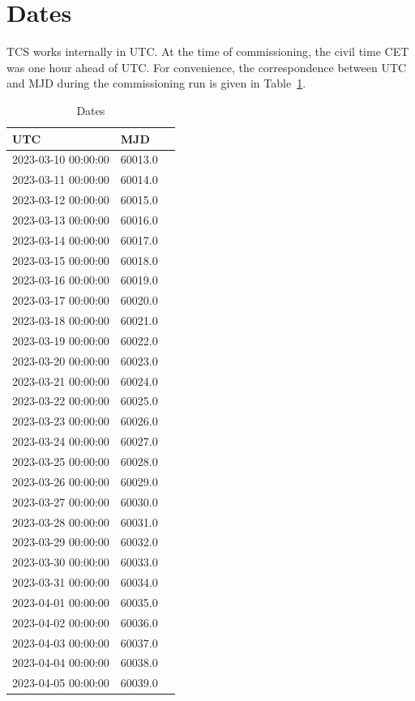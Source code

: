 \documentclass{article}
\begin{document}
\clearpage
\section{Dates}

TCS works internally in UTC. At the time of commissioning, the civil time CET was one hour ahead of UTC. For convenience, the correspondence between UTC and MJD during the commissioning run is given in Table~\ref{table:dates}.

\begin{table}[pb]
\caption{Dates}
\label{table:dates}
\begin{center}
\begin{tabular}{lll}
\hline
UTC&MJD\\
\hline
2023-03-10 00:00:00&60013.0\\
2023-03-11 00:00:00&60014.0\\
2023-03-12 00:00:00&60015.0\\
2023-03-13 00:00:00&60016.0\\
2023-03-14 00:00:00&60017.0\\
2023-03-15 00:00:00&60018.0\\
2023-03-16 00:00:00&60019.0\\
2023-03-17 00:00:00&60020.0\\
2023-03-18 00:00:00&60021.0\\
2023-03-19 00:00:00&60022.0\\
2023-03-20 00:00:00&60023.0\\
2023-03-21 00:00:00&60024.0\\
2023-03-22 00:00:00&60025.0\\
2023-03-23 00:00:00&60026.0\\
2023-03-24 00:00:00&60027.0\\
2023-03-25 00:00:00&60028.0\\
2023-03-26 00:00:00&60029.0\\
2023-03-27 00:00:00&60030.0\\
2023-03-28 00:00:00&60031.0\\
2023-03-29 00:00:00&60032.0\\
2023-03-30 00:00:00&60033.0\\
2023-03-31 00:00:00&60034.0\\
2023-04-01 00:00:00&60035.0\\
2023-04-02 00:00:00&60036.0\\
2023-04-03 00:00:00&60037.0\\
2023-04-04 00:00:00&60038.0\\
2023-04-05 00:00:00&60039.0\\

\end{tabular}
\end{center}
\end{table}
\end{document}

